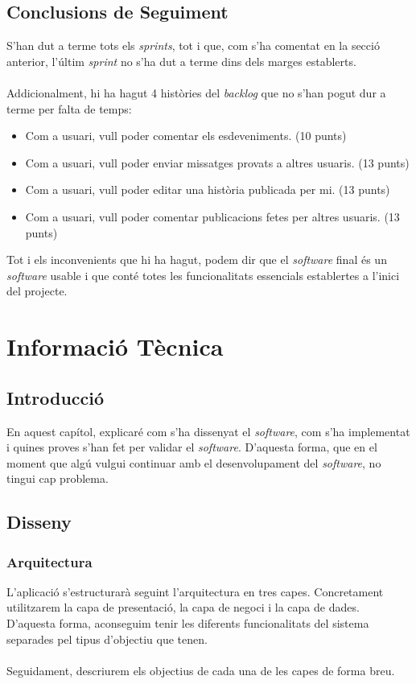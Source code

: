\documentclass[11pt,catalan,listoffigures,listoftables]{tfgetsinf}
\begin{document}
\section{Conclusions de Seguiment}

S'han dut a terme tots els \textit{sprints}, tot i que, com s'ha comentat en la secció anterior, l'últim \textit{sprint} no s'ha dut a terme dins dels marges establerts.\\ \\
Addicionalment, hi ha hagut 4 històries del \textit{backlog} que no s'han pogut dur a terme per falta de temps:
\begin{itemize}
\item Com a usuari, vull poder comentar els esdeveniments. (10 punts)
\item Com a usuari, vull poder enviar missatges provats a altres usuaris. (13 punts)
\item Com a usuari, vull poder editar una història publicada per mi. (13 punts)
\item Com a usuari, vull poder comentar publicacions fetes per altres usuaris. (13 punts)
\end{itemize}
Tot i els inconvenients que hi ha hagut, podem dir que el \textit{software} final és un \textit{software} usable i que conté totes les funcionalitats essencials establertes a l'inici del projecte.

\chapter{Informació Tècnica}

\section{Introducció}

En aquest capítol, explicaré com s'ha dissenyat el \textit{software}, com s'ha implementat i quines proves s'han fet per validar el \textit{software}. D'aquesta forma, que en el moment que algú vulgui continuar amb el desenvolupament del \textit{software}, no tingui cap problema.

\section{Disseny}
\subsection{Arquitectura}
L'aplicació s'estructurarà seguint l'arquitectura en tres capes. Concretament utilitzarem la capa de presentació, la capa de negoci i la capa de dades. D'aquesta forma, aconseguim tenir les diferents funcionalitats del sistema separades pel tipus d'objectiu que tenen.\\ \\
Seguidament, descriurem els objectius de cada una de les capes de forma breu.
\end{document}
